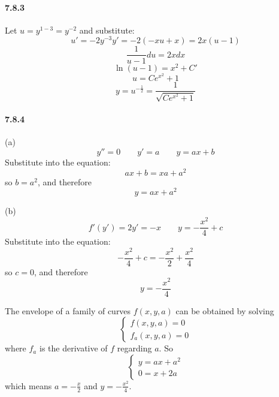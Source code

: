 \documentclass[a4paper]{article}
\begin{document}
\paragraph{7.8.3}
Let $u=y^{1-3}=y^{-2}$ and substitute:
\[
u'=-2y^{-3}y'=-2(-xu+x)=2x(u-1)
\]
\[
\frac{1}{u-1}du=2xdx
\]
\[
\ln(u-1)=x^2+C'
\]
\[
u=Ce^{x^2}+1
\]
\[
y=u^{-\frac{1}{2}}=\frac{1}{\sqrt{Ce^{x^2}+1}}
\]

\paragraph{7.8.4}
(a)
\[
y''=0\qquad y'=a\qquad y=ax+b
\]
Substitute into the equation:
\[
ax+b=xa+a^2
\]
so $b=a^2$, and therefore
\[y=ax+a^2\]

(b)
\[
f'(y')=2y'=-x\qquad y=-\frac{x^2}{4}+c
\]
Substitute into the equation:
\[
-\frac{x^2}{4}+c=-\frac{x^2}{2}+\frac{x^2}{4}
\]
so $c=0$, and therefore
\[y=-\frac{x^2}{4}\]

The envelope of a family of curves $f(x,y,a)$ can be obtained by solving 
\[
\begin{cases}
    f(x,y,a)=0\\
    f_a(x,y,a)=0
\end{cases}
\]
where $f_a$ is the derivative of $f$ regarding $a$. So
\[
\begin{cases}
    y=ax+a^2\\
    0=x+2a
\end{cases}
\]
which means $a=-\frac{x}{2}$ and $y=-\frac{x^2}{4}$.
\end{document}
